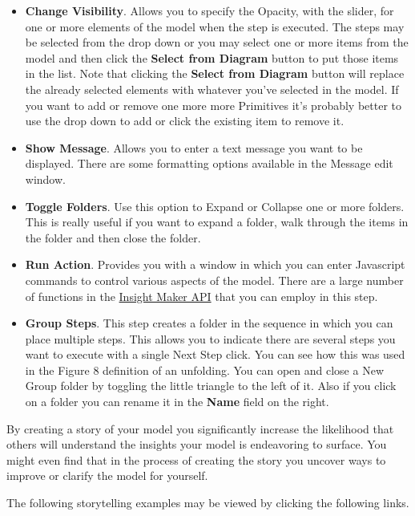 \documentclass[]{memoir}
\begin{document}
\begin{itemize}
\itemsep1pt\parskip0pt
\item
  \textbf{Change Visibility}. Allows you to specify the Opacity, with
  the slider, for one or more elements of the model when the step is
  executed. The steps may be selected from the drop down or you may
  select one or more items from the model and then click the
  \textbf{Select from Diagram} button to put those items in the list.
  Note that clicking the \textbf{Select from Diagram} button will
  replace the already selected elements with whatever you've selected in
  the model. If you want to add or remove one more more Primitives it's
  probably better to use the drop down to add or click the existing item
  to remove it.
\item
  \textbf{Show Message}. Allows you to enter a text message you want to
  be displayed. There are some formatting options available in the
  Message edit window.
\item
  \textbf{Toggle Folders}. Use this option to Expand or Collapse one or
  more folders. This is really useful if you want to expand a folder,
  walk through the items in the folder and then close the folder.
\item
  \textbf{Run Action}. Provides you with a window in which you can enter
  Javascript commands to control various aspects of the model. There are
  a large number of functions in the
  \href{http://insightmaker.com/sites/default/files/API/files/API-js.html}{Insight
  Maker API} that you can employ in this step.
\item
  \textbf{Group Steps}. This step creates a folder in the sequence in
  which you can place multiple steps. This allows you to indicate there
  are several steps you want to execute with a single Next Step click.
  You can see how this was used in the Figure 8 definition of an
  unfolding. You can open and close a New Group folder by toggling the
  little triangle to the left of it. Also if you click on a folder you
  can rename it in the \textbf{Name} field on the right.
\end{itemize}

By creating a story of your model you significantly increase the
likelihood that others will understand the insights your model is
endeavoring to surface. You might even find that in the process of
creating the story you uncover ways to improve or clarify the model for
yourself.

The following storytelling examples may be viewed by clicking the
following links.
\end{document}
